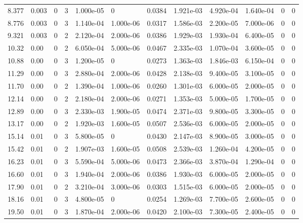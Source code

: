 \documentclass[preview]{standalone}
\begin{document}
{{\begin{tabular}{L{1.2cm}C{1.2cm} C{0.3cm}C{0.5cm} C{1.4cm}C{1.4cm} C{1.4cm}C{1.4cm} C{1.6cm}C{1.6cm} C{1.6cm}C{1.6cm}}
  8.377  &  0.003  & 0     &  3 &  1.000e-05  & 0  &  0.0384&   1.921e-03& 4.920e-04 & 1.640e-04   &  0 & 0  \\ 
  8.776  &  0.003  & 0     &  3 &  1.140e-04  & 1.000e-06  &  0.0317&   1.586e-03& 2.200e-05 & 7.000e-06   &  0 & 0  \\ 
  9.321  &  0.003  & 0     &  2 &  2.120e-04  & 2.000e-06  &  0.0386&   1.929e-03& 1.930e-04 & 6.400e-05   &  0 & 0  \\ 
  10.32  &  0.00  & 0     &  2 &  6.050e-04  & 5.000e-06  &  0.0467&   2.335e-03& 1.070e-04 & 3.600e-05   &  0 & 0  \\ 
  10.88  &  0.00  & 0     &  3 &  1.200e-05  & 0  &  0.0273&   1.363e-03& 1.846e-03 & 6.150e-04   &  0 & 0  \\ 
  11.29  &  0.00  & 0     &  3 &  2.880e-04  & 2.000e-06  &  0.0428&   2.138e-03& 9.400e-05 & 3.100e-05   &  0 & 0  \\ 
  11.70  &  0.00  & 0     &  2 &  1.390e-04  & 1.000e-06  &  0.0260&   1.301e-03& 6.000e-05 & 2.000e-05   &  0 & 0  \\ 
  12.14  &  0.00  & 0     &  2 &  2.180e-04  & 2.000e-06  &  0.0271&   1.353e-03& 5.000e-05 & 1.700e-05   &  0 & 0  \\ 
  12.89  &  0.00  & 0     &  3 &  2.330e-03  & 1.900e-05  &  0.0474&   2.371e-03& 9.800e-05 & 3.300e-05   &  0 & 0  \\ 
  13.17  &  0.00  & 0     &  2 &  1.920e-03  & 1.600e-05  &  0.0507&   2.536e-03& 6.000e-05 & 2.000e-05   &  0 & 0  \\ 
  15.14  &  0.01  & 0     &  3 &  5.800e-05  & 0  &  0.0430&   2.147e-03& 8.900e-05 & 3.000e-05   &  0 & 0  \\ 
  15.42  &  0.01  & 0     &  2 &  1.907e-03  & 1.600e-05  &  0.0508&   2.539e-03& 1.260e-04 & 4.200e-05   &  0 & 0  \\ 
  16.23  &  0.01  & 0     &  3 &  5.590e-04  & 5.000e-06  &  0.0473&   2.366e-03& 3.870e-04 & 1.290e-04   &  0 & 0  \\ 
  16.60  &  0.01  & 0     &  3 &  1.940e-04  & 2.000e-06  &  0.0386&   1.930e-03& 6.000e-05 & 2.000e-05   &  0 & 0  \\ 
  17.90  &  0.01  & 0     &  2 &  3.210e-04  & 3.000e-06  &  0.0303&   1.515e-03& 6.000e-05 & 2.000e-05   &  0 & 0  \\ 
  18.16  &  0.01  & 0     &  3 &  4.800e-05  & 0  &  0.0254&   1.269e-03& 7.700e-05 & 2.600e-05   &  0 & 0  \\ 
  19.50  &  0.01  & 0     &  3 &  1.870e-04  & 2.000e-06  &  0.0420&   2.100e-03& 7.300e-05 & 2.400e-05   &  0 & 0  \\ 

\end{tabular}}}
\end{document}
